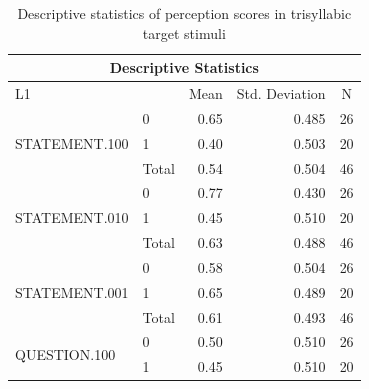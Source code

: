 \documentclass[a4paper]{article}
\begin{document}
\begin{table}[H]
\begin{center}
      \caption{Descriptive statistics of perception scores in trisyllabic target stimuli}
      \label{tab:tri-descriptive}
\begin{tabular}{|l|l|r|r|r|} 
\hline
\multicolumn{5}{|c|}{Descriptive Statistics}                                                                                       \\ 
\hline
L1                             &       & \multicolumn{1}{c|}{Mean} & \multicolumn{1}{c|}{Std. Deviation} & \multicolumn{1}{c|}{N}  \\ 
\hline
\multirow{3}{*}{STATEMENT.100} & 0     & 0.65                      & 0.485                               & 26                      \\ 
\cline{2-5}
                               & 1     & 0.40                      & 0.503                               & 20                      \\ 
\cline{2-5}
                               & Total & 0.54                      & 0.504                               & 46                      \\ 
\hline
\multirow{3}{*}{STATEMENT.010} & 0     & 0.77                      & 0.430                               & 26                      \\ 
\cline{2-5}
                               & 1     & 0.45                      & 0.510                               & 20                      \\ 
\cline{2-5}
                               & Total & 0.63                      & 0.488                               & 46                      \\ 
\hline
\multirow{3}{*}{STATEMENT.001} & 0     & 0.58                      & 0.504                               & 26                      \\ 
\cline{2-5}
                               & 1     & 0.65                      & 0.489                               & 20                      \\ 
\cline{2-5}
                               & Total & 0.61                      & 0.493                               & 46                      \\ 
\hline
\multirow{3}{*}{QUESTION.100}  & 0     & 0.50                      & 0.510                               & 26                      \\ 
\cline{2-5}
                               & 1     & 0.45                      & 0.510                               & 20                      \\ 

\end{tabular}
\end{center}
\end{table}
\end{document}
